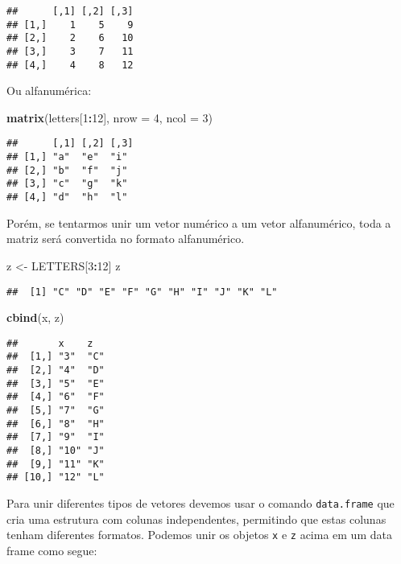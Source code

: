 \documentclass[
]{book}
\newenvironment{Shaded}{\begin{snugshade}}{\end{snugshade}}
\newcommand{\DataTypeTok}[1]{\textcolor[rgb]{0.13,0.29,0.53}{#1}}
\newcommand{\DecValTok}[1]{\textcolor[rgb]{0.00,0.00,0.81}{#1}}
\newcommand{\KeywordTok}[1]{\textcolor[rgb]{0.13,0.29,0.53}{\textbf{#1}}}
\newcommand{\NormalTok}[1]{#1}
\newcommand{\OperatorTok}[1]{\textcolor[rgb]{0.81,0.36,0.00}{\textbf{#1}}}
\newcommand{\StringTok}[1]{\textcolor[rgb]{0.31,0.60,0.02}{#1}}
\begin{document}
\begin{verbatim}
##      [,1] [,2] [,3]
## [1,]    1    5    9
## [2,]    2    6   10
## [3,]    3    7   11
## [4,]    4    8   12
\end{verbatim}

Ou alfanumérica:

\begin{Shaded}
\begin{Highlighting}[]
\KeywordTok{matrix}\NormalTok{(letters[}\DecValTok{1}\OperatorTok{:}\DecValTok{12}\NormalTok{], }\DataTypeTok{nrow =} \DecValTok{4}\NormalTok{, }\DataTypeTok{ncol =} \DecValTok{3}\NormalTok{)}
\end{Highlighting}
\end{Shaded}

\begin{verbatim}
##      [,1] [,2] [,3]
## [1,] "a"  "e"  "i" 
## [2,] "b"  "f"  "j" 
## [3,] "c"  "g"  "k" 
## [4,] "d"  "h"  "l"
\end{verbatim}

Porém, se tentarmos unir um vetor numérico a um vetor alfanumérico, toda a matriz será convertida no formato alfanumérico.

\begin{Shaded}
\begin{Highlighting}[]
\NormalTok{z <-}\StringTok{ }\NormalTok{LETTERS[}\DecValTok{3}\OperatorTok{:}\DecValTok{12}\NormalTok{]}
\NormalTok{z}
\end{Highlighting}
\end{Shaded}

\begin{verbatim}
##  [1] "C" "D" "E" "F" "G" "H" "I" "J" "K" "L"
\end{verbatim}

\begin{Shaded}
\begin{Highlighting}[]
\KeywordTok{cbind}\NormalTok{(x, z)}
\end{Highlighting}
\end{Shaded}

\begin{verbatim}
##       x    z  
##  [1,] "3"  "C"
##  [2,] "4"  "D"
##  [3,] "5"  "E"
##  [4,] "6"  "F"
##  [5,] "7"  "G"
##  [6,] "8"  "H"
##  [7,] "9"  "I"
##  [8,] "10" "J"
##  [9,] "11" "K"
## [10,] "12" "L"
\end{verbatim}

Para unir diferentes tipos de vetores devemos usar o comando \texttt{data.frame} que cria uma estrutura com colunas independentes, permitindo que estas colunas tenham diferentes formatos. Podemos unir os objetos \texttt{x} e \texttt{z} acima em um data frame como segue:
\end{document}
